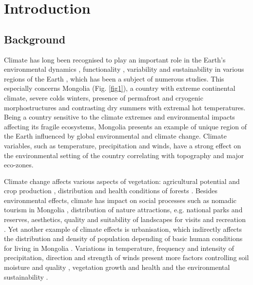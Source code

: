 \documentclass[geosciences,article,submit,pdftex,moreauthors]{Definitions/mdpi}
\begin{document}
\section{Introduction}

\subsection{Background}
Climate has long been recognised to play an important role in the Earth’s environmental dynamics \cite{Dashkhuu}, functionality \cite{Natsagdorj,An}, variability and sustainability in various regions of the Earth \cite{SATTLER2021101620,Jiang,Lemenkova2021a,DUGERDIL2021107235}, which has been a subject of numerous studies. This especially concerns Mongolia (Fig. \ref{fig1}), a country with extreme continental climate, severe colds winters, presence of permafrost and cryogenic morphostructures \cite{Dashtseren2021,Tsedevdorj2021,Blomdin} and contrasting dry summers with extremal hot temperatures. Being a country sensitive to the climate extremes and environmental impacts affecting its fragile ecosystems, Mongolia presents an example of unique region of the Earth influenced by global environmental and climate change. Climate variables, such as temperature, precipitation and winds, have a strong effect on the environmental setting of the country correlating with topography and major eco-zones. 

Climate change affects various aspects of vegetation: agricultural potential and crop production \cite{Otgonbayar,Lemenkova2021b,Munkhtur}, distribution and health conditions of forests \cite{Erdenebaatar,WANG2022e02034}. Besides environmental effects, climate has impact on social processes such as nomadic tourism in Mongolia \cite{OGORMAN2007161,BUCKLEY200847}, distribution of nature attractions, e.g. national parks and reserves, aesthetics, quality and suitability of landscapes for visits and recreation \cite{Gantemur,Klauco2017}. Yet another example of climate effects is urbanisation, which indirectly affects the distribution and density of population depending of basic human conditions for living in Mongolia \cite{Fan,Khishigdorj,Oyunjargal}. Variations in temperature, frequency and intensity of precipitation, direction and strength of winds present more factors controlling soil moisture and quality \cite{Samdandorj}, vegetation growth and health \cite{Kolar,Lemenkova2020a,MENG2022152198} and the environmental sustainability \cite{Guo,Lemenkova2020b}. 
\end{document}
